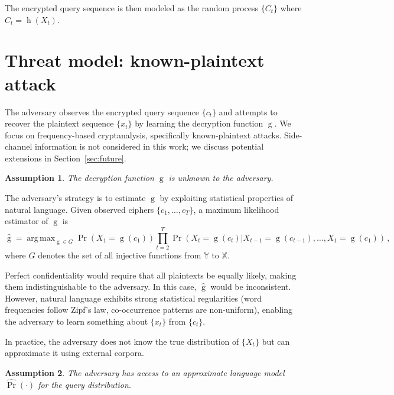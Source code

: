 \documentclass[final,11pt]{article}
\newcommand{\argmax}{\operatorname{arg\,max}}
\newcommand{\set}[1]{\mathbb{#1}}
\theoremstyle{plain}
\newtheorem{assumption}{Assumption}
\theoremstyle{remark}
\begin{document}
The encrypted query sequence is then modeled as the random process
$\{C_t\}$ where $C_t = \operatorname{h}(X_t)$.

\hypertarget{threat-model-known-plaintext-attack}{%
\section{Threat model: known-plaintext
attack}\label{threat-model-known-plaintext-attack}}

\label{sec:threat} The adversary observes the encrypted query sequence
$\{c_t\}$ and attempts to recover the plaintext sequence $\{x_t\}$ by
learning the decryption function $\operatorname{g}$. We focus on
frequency-based cryptanalysis, specifically known-plaintext attacks.
Side-channel information is not considered in this work; we discuss
potential extensions in Section~\ref{sec:future}.

\begin{assumption}
The decryption function $\operatorname{g}$ is unknown to the adversary.
\end{assumption}

The adversary's strategy is to estimate $\operatorname{g}$ by exploiting
statistical properties of natural language. Given observed ciphers
$\{c_1,\ldots,c_T\}$, a maximum likelihood estimator of $\operatorname{g}$
is
\begin{equation}
\label{eq:mle}
    \hat{\operatorname{g}} = \argmax_{\operatorname{g} \in G}
    \Pr(X_1 = \operatorname{g}(c_1)) \prod_{t=2}^{T} \Pr(X_t =
    \operatorname{g}(c_t) | X_{t-1} = \operatorname{g}(c_{t-1}),
            \ldots, X_1 = \operatorname{g}(c_1))\,,
\end{equation}
where $G$ denotes the set of all injective functions from $\set{Y}$ to
$\set{X}$.

Perfect confidentiality would require that all plaintexts be equally likely,
making them indistinguishable to the adversary. In this case,
$\hat{\operatorname{g}}$ would be inconsistent. However, natural language
exhibits strong statistical regularities (word frequencies follow Zipf's law,
co-occurrence patterns are non-uniform), enabling the adversary to learn
something about $\{x_t\}$ from $\{c_t\}$.

In practice, the adversary does not know the true distribution of $\{X_t\}$
but can approximate it using external corpora.

\begin{assumption}
The adversary has access to an approximate language model
$\hat{\Pr}(\cdot)$ for the query distribution.
\end{assumption}
\end{document}
